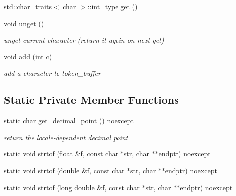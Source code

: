 \begin{DoxyCompactItemize}
std\+::char\+\_\+traits$<$ char $>$\+::int\+\_\+type \hyperlink{classnlohmann_1_1detail_1_1lexer_a901e45a34e1fb1d97ab62350b0c3ef26}{get} ()
\item 
void \hyperlink{classnlohmann_1_1detail_1_1lexer_a626f145768762057dc68a4666eb577db}{unget} ()
\begin{DoxyCompactList}\small\item\em unget current character (return it again on next get) \end{DoxyCompactList}\item 
void \hyperlink{classnlohmann_1_1detail_1_1lexer_acec899d31af1fd647911e46e8535c283}{add} (int c)
\begin{DoxyCompactList}\small\item\em add a character to token\+\_\+buffer \end{DoxyCompactList}\end{DoxyCompactItemize}
\subsection*{Static Private Member Functions}
\begin{DoxyCompactItemize}
\item 
static char \hyperlink{classnlohmann_1_1detail_1_1lexer_ae545b0856f57220645d749ab8c494f47}{get\+\_\+decimal\+\_\+point} () noexcept
\begin{DoxyCompactList}\small\item\em return the locale-\/dependent decimal point \end{DoxyCompactList}\item 
static void \hyperlink{classnlohmann_1_1detail_1_1lexer_a1a2d4cc5d9fed4783aa2a98497925511}{strtof} (float \&f, const char $\ast$str, char $\ast$$\ast$endptr) noexcept
\item 
static void \hyperlink{classnlohmann_1_1detail_1_1lexer_a8cd877d10b31bc819e4f030292737ea6}{strtof} (double \&f, const char $\ast$str, char $\ast$$\ast$endptr) noexcept
\item 
static void \hyperlink{classnlohmann_1_1detail_1_1lexer_a0e28dda9a1e007d55d03e8d39dd3b9fa}{strtof} (long double \&f, const char $\ast$str, char $\ast$$\ast$endptr) noexcept
\end{DoxyCompactItemize}
